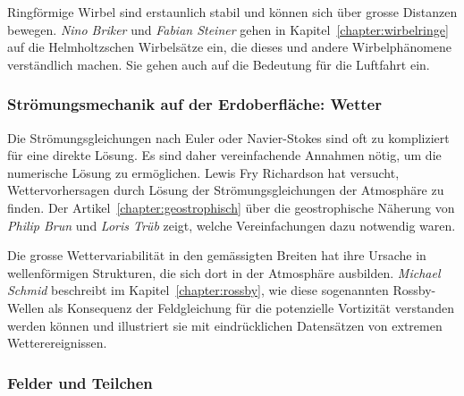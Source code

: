 %
%
Ringförmige Wirbel sind erstaunlich stabil und können sich über
%
grosse Distanzen bewegen.
\emph{Nino Briker}
%
%
und
\emph{Fabian Steiner}
%
%
gehen in Kapitel~\ref{chapter:wirbelringe} auf die Helmholtzschen
%
%
Wirbelsätze ein, die dieses und andere Wirbelphänomene verständlich
machen.
Sie gehen auch auf die Bedeutung für die Luftfahrt ein.
%

%
%
\subsubsection{Strömungsmechanik auf der Erdoberfläche: Wetter}

%
%
Die Strömungsgleichungen nach Euler oder Navier-Stokes
sind oft zu kompliziert für eine direkte Lösung.
Es sind daher vereinfachende Annahmen nötig, um die numerische
Lösung zu ermöglichen.
Lewis Fry Richardson hat versucht, Wettervorhersagen durch Lösung
%
%
der Strömungsgleichungen der Atmosphäre zu finden.
Der Artikel~\ref{chapter:geostrophisch} über die geostrophische
Näherung von 
%
\emph{Philip Brun}
%
%
und
\emph{Loris Trüb}
%
%
zeigt, welche Vereinfachungen dazu notwendig waren.

%
%
Die grosse Wettervariabilität in den gemässigten Breiten hat ihre
%
Ursache in wellenförmigen Strukturen, die sich dort in der Atmosphäre
ausbilden.
\emph{Michael Schmid}
%
%
beschreibt im Kapitel~\ref{chapter:rossby}, wie diese sogenannten
Rossby-Wellen als Konsequenz der Feldgleichung für die potenzielle
Vortizität verstanden werden können und illustriert sie mit
%
eindrücklichen Datensätzen von extremen Wetterereignissen.

%
%
\subsubsection{Felder und Teilchen}

